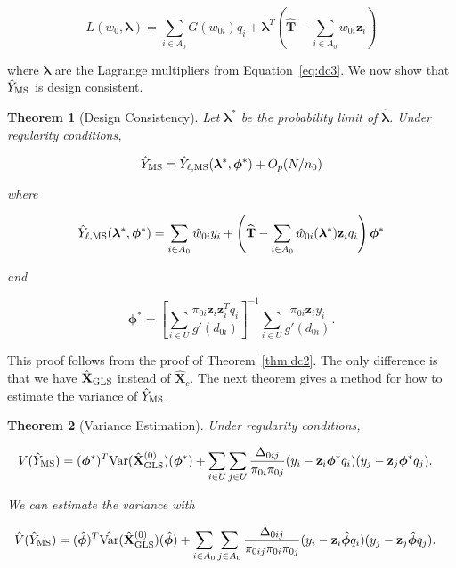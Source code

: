 \documentclass[12pt]{article}
\newtheorem{theorem}{Theorem}
\newcommand{\Var}{{\text{Var}}}
\renewcommand{\bf}[1]{\mathbf{#1}}
\begin{document}
$$
L(w_{0}, \bm \lambda) = \sum_{i \in A_0} G(w_{0i}) q_i + {\bm \lambda}^T
\left(\widehat{\bf{T}} - \sum_{i \in A_0} w_{0i} \bf z_i\right)
$$

where $\bm \lambda$ are the Lagrange multipliers from Equation~\ref{eq:dc3}.
We now show that $\hat Y_{\rm MS}$ is design consistent.

\begin{theorem}[Design Consistency]
  Let $\bm \lambda^*$ be the probability limit of $\hat{\bm \lambda}$.
  Under regularity conditions,

  $$
  \hat Y_{\rm MS} = \hat Y_{\ell, \rm MS}(\bm \lambda^*, \bm \phi^*) + O_p(N / n_0)
  $$

  where

  $$
  \hat Y_{\ell, \rm MS}(\bm \lambda^*, \bm \phi^*) = \sum_{i \in A_0} \hat w_{0i} y_i + \left(
    \widehat{\bf T} - \sum_{i \in A_0} \hat w_{0i}(\bm \lambda^*) \bf z_i q_i
  \right)\bm \phi^*
  $$

  and 

  $$
  \bm \phi^* = 
  \left[\sum_{i \in U} \frac{\pi_{0i} \bf z_i \bf z_i^T q_i}{g'(d_{0i})}\right]^{-1}
  \sum_{i \in U} \frac{\pi_{0i} \bf z_i y_i}{g'(d_{0i})}.
  $$
\end{theorem}

This proof follows from the proof of Theorem~\ref{thm:dc2}. The only
difference is that we have $\hat{\bf X}_{\rm GLS}$ instead of $\hat{\bf X}_c$.
The next theorem gives a method for how to estimate the variance of 
$\hat Y_{\rm MS}$.

\begin{theorem}[Variance Estimation]
  Under regularity conditions,

  $$
  \begin{aligned}
    V(\hat Y_{\rm MS}) 
    &= (\bm \phi^{*})^T\Var(\hat{\bf X}_{\rm GLS}^{(0)}) (\bm \phi^{*}) + 
      \sum_{i \in U} \sum_{j \in U} \frac{\Delta_{0ij}}{\pi_{0i}\pi_{0j}}
      (y_i - \bf z_i\bm \phi^{*}q_i)
      (y_j - \bf z_j\bm \phi^{*}q_j). 
  \end{aligned}
  $$

  We can estimate the variance with

  $$
  \begin{aligned}
    \hat V(\hat Y_{\rm MS}) 
    &= (\hat{\bm \phi})^T \hat \Var(\hat{\bf X}_{\rm GLS}^{(0)}) (\hat{\bm \phi})
    + \sum_{i \in A_0} \sum_{j \in A_0} \frac{\Delta_{0ij}}{\pi_{0ij}\pi_{0i}\pi_{0j}}
      (y_i - \bf z_i \hat{\bm \phi}q_i)
      (y_j - \bf z_j \hat{\bm \phi}q_j). 
  \end{aligned}
  $$

\end{theorem}
\end{document}
